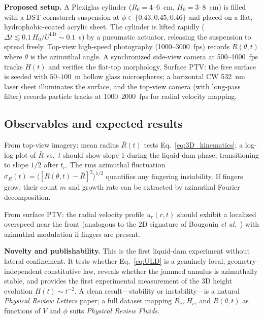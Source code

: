 \documentclass[aps,preprint,superscriptaddress,longbibliography]{revtex4-2}
\newcommand{\ULD}{{U^{\mathrm{LD}}}}
\begin{document}
\begin{mdframed}[style=setupbox]
\textbf{Proposed setup.}
A Plexiglas cylinder ($R_0 = 4$--$6$~cm, $H_0 = 3$--$8$~cm) is filled with
a DST cornstarch suspension at $\phi \in \{0.43, 0.45, 0.46\}$ and placed on
a flat, hydrophobic-coated acrylic sheet.  The cylinder is lifted rapidly
($\Delta t \lesssim 0.1\,H_0/\ULD \sim 0.1$~s) by a pneumatic actuator,
releasing the suspension to spread freely.  Top-view high-speed photography
(1000--3000~fps) records $R(\theta, t)$ where $\theta$ is the azimuthal angle.
A synchronized side-view camera at 500--1000~fps tracks $H(t)$ and verifies
the flat-top morphology.  Surface PTV: the free surface is seeded with
$50$--$100$~\textmu m hollow glass microspheres; a horizontal CW 532~nm
laser sheet illuminates the surface, and the top-view camera (with long-pass
filter) records particle tracks at 1000--2000~fps for radial velocity mapping.
\end{mdframed}

\subsection{Observables and expected results}

From top-view imagery: mean radius $\bar{R}(t)$ tests Eq.~\eqref{eq:3D_kinematics};
a log-log plot of $\bar{R}$ vs.\ $t$ should show slope 1 during the liquid-dam
phase, transitioning to slope $1/2$ after $t_c$.  The rms azimuthal fluctuation
$\sigma_R(t) = \langle [R(\theta,t) - \bar{R}]^2\rangle^{1/2}$ quantifies any
fingering instability.  If fingers grow, their count $m$ and growth rate can be
extracted by azimuthal Fourier decomposition.

From surface PTV: the radial velocity profile $u_r(r,t)$ should exhibit a
localized overspeed near the front (analogous to the 2D signature of Bougouin
\textit{et al.}~\cite{Bougouin2026PRL}) with azimuthal modulation if fingers
are present.

\begin{mdframed}[style=noveltybox]
\textbf{Novelty and publishability.}
This is the first liquid-dam experiment without lateral confinement.  It tests
whether Eq.~\eqref{eq:ULD} is a genuinely local, geometry-independent
constitutive law, reveals whether the jammed annulus is azimuthally stable,
and provides the first experimental measurement of the 3D height evolution
$H(t) \sim t^{-2}$.  A clean result---stability or instability---is a natural
\textit{Physical Review Letters} paper; a full dataset mapping $R_c$, $H_c$,
and $R(\theta, t)$ as functions of $V$ and $\phi$ suits
\textit{Physical Review Fluids}.
\end{mdframed}
\end{document}
